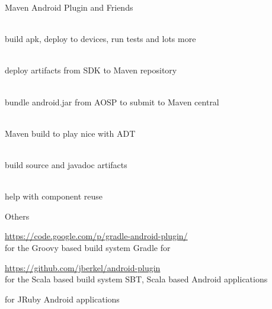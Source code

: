 \documentclass[aspectratio=169]{beamer}
\newcommand{\surl}[1] {{\tiny \url{#1}}}
\begin{document}
    \begin{frame}{Maven Android Plugin and Friends}
      \begin{description}
       \item<1->[Maven Android Plugin \surl{http://code.google.com/p/maven-android-plugin/}] \hfill \\ build apk, deploy to devices, run tests and lots more
       \item<2->[Maven Android SDK Deployer \surl{https://github.com/mosabua/maven-android-sdk-deployer}] \hfill \\ deploy artifacts from SDK to Maven repository
       \item<3->[Android4Maven \surl{http://sourceforge.net/projects/android4maven/}] \hfill \\ bundle android.jar from AOSP to submit to Maven central
       \item<4->[M2E Android \surl{https://github.com/rgladwell/m2e-android}] \hfill \\ Maven build to play nice with ADT
       \item<5->[AndroidSDKFido \surl{https://github.com/joakime/android-sdkfido}] \hfill \\  build source and javadoc artifacts
       \item<6->[Android RIndirect \surl{https://github.com/akquinet/android-rindirect}] \hfill \\  help with component reuse
      \end{description}
    \end{frame}

    \begin{frame}{Others}
      \begin{description}
        \item<1->[Gradle Android Plugin] \surl{https://code.google.com/p/gradle-android-plugin/} \hfill \\ for the Groovy based build system Gradle
    for    \item<2->[SBT Android Plugin] \surl{https://github.com/jberkel/android-plugin} \hfill \\ for the Scala based build system SBT, Scala based Android applications
        \item<3->[Rake/Ruboto/Maven] for JRuby Android applications 
      \end{description}
    \end{frame}
\end{document}
